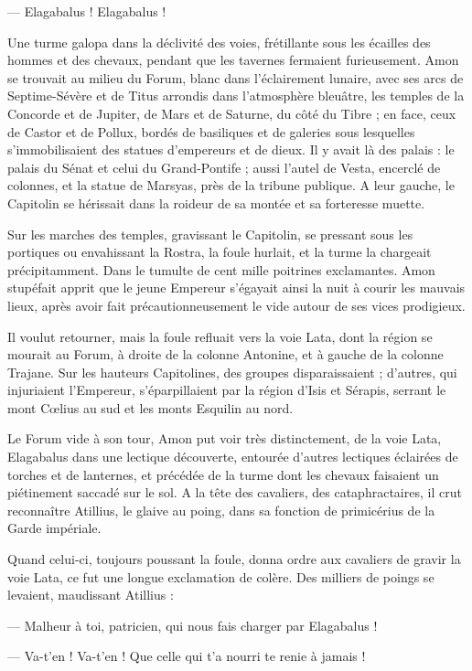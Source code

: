 \documentclass[a4paper, 11pt, oneside, polutonikogreek, french]{article}
\begin{document}
--- Elagabalus ! Elagabalus !

Une turme galopa dans la déclivité des voies, frétillante sous les écailles des hommes et des chevaux, pendant que les tavernes fermaient furieusement. Amon se trouvait au milieu du Forum, blanc dans l'éclairement lunaire, avec ses arcs de Septime-Sévère et de Titus arrondis dans l'atmosphère bleuâtre, les temples de la Concorde et de Jupiter, de Mars et de Saturne, du côté du Tibre ; en face, ceux de Castor et de Pollux, bordés de basiliques et de galeries sous lesquelles s'immobilisaient des statues d'empereurs et de dieux. Il y avait là des palais : le palais du Sénat et celui du Grand-Pontife ; aussi l'autel de Vesta, encerclé de colonnes, et la statue de Marsyas, près de la tribune publique. A leur gauche, le Capitolin se hérissait dans la roideur de sa montée et sa forteresse muette.

Sur les marches des temples, gravissant le Capitolin, se pressant sous les portiques ou envahissant la Rostra, la foule hurlait, et la turme la chargeait précipitamment. Dans le tumulte de cent mille poitrines exclamantes. Amon stupéfait apprit que le jeune Empereur s'égayait ainsi la nuit à courir les mauvais lieux, après avoir fait précautionneusement le vide autour de ses vices prodigieux.

Il voulut retourner, mais la foule refluait vers la voie Lata, dont la région se mourait au Forum, à droite de la colonne Antonine, et à gauche de la colonne Trajane. Sur les hauteurs Capitolines, des groupes disparaissaient ; d'autres, qui injuriaient l'Empereur, s'éparpillaient par la région d'Isis et Sérapis, serrant le mont Cœlius au sud et les monts Esquilin au nord.

Le Forum vide à son tour, Amon put voir très distinctement, de la voie Lata, Elagabalus dans une lectique découverte, entourée d'autres lectiques éclairées de torches et de lanternes, et précédée de la turme dont les chevaux faisaient un piétinement saccadé sur le sol. A la tête des cavaliers, des cataphractaires, il crut reconnaître Atillius, le glaive au poing, dans sa fonction de primicérius de la Garde impériale.

Quand celui-ci, toujours poussant la foule, donna ordre aux cavaliers de gravir la voie Lata, ce fut une longue exclamation de colère. Des milliers de poings se levaient, maudissant Atillius :

--- Malheur à toi, patricien, qui nous fais charger par Elagabalus !

--- Va-t'en ! Va-t'en ! Que celle qui t'a nourri te renie à jamais !
\end{document}
